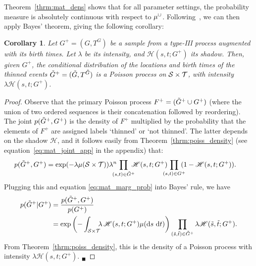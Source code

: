 \documentclass{statsoc}
\newtheorem{coro}[defn]{Corollary}
\begin{document}
Theorem~\ref{thrm:mat_dens} shows that for all parameter settings, the \matern probability measure is absolutely continuous with respect to $\mu^{\cup}$.
Following~\citet[Theorem 3.14]{schervish95}, we can then apply Bayes' theorem, %
giving the following corollary: %
\begin{coro} \label{prop:mat_post} Let ${G^+ = (G, T^G)}$ be a sample from a \matern type-III process 
 augmented with its birth times. Let $\lambda$ be its intensity, and $\mathscr{H}(s,t;G^+)$ its shadow.
Then, given $G^+$, the conditional distribution of the locations and birth times of the thinned events
${\tilde{G}^+ = (\tilde{G},T^{\tilde{G}})}$ is a Poisson process on ${{\mathcal S} \times {\mathcal T}}$, with intensity $\lambda  \mathscr{H}(s,t; G^+)$.
\end{coro}
\begin{proof}
Observe that the primary Poisson process $F^+ = (\tilde{G}^+ \cup G^+)$ (where the union of two ordered sequences is their concatenation followed
by reordering).  The joint $p(\tilde{G}^+, G^+)$ is the density of $F^+$ multiplied by the
probability that the elements of $F^+$ are assigned labels `thinned' or `not thinned'. 
The latter depends on the shadow $\mathscr{H}$, and it follows easily from Theorem~\ref{thrm:poiss_density} 
(see equation~\eqref{eq:mat_joint_app} in the appendix) that:
\begin{align}
   p(\tG^+, G^+) &= \exp(-\lambda \mu(\cS \times \cT)) \lambda^{n}  \! \! \! \!\! \prod_{(s,t) \in \tG^+}  \! \! \! \!\mathscr{H}(s,t;G^+)  \! \! \! \! \! \prod_{(s,t) \in G^+}  \! \! \! \!(1- \mathscr{H}(s,t;G^+)). \label{eq:mat_joint}
\end{align}
Plugging this and equation \eqref{eq:mat_marg_prob} into Bayes' rule, we have
\begin{align}
  p(\tG^+ | G^+) &= \frac{p(\tG^+, G^+)}{p(G^+)} \\ %
  &= \exp \left(- \int_{\cS \times \cT} \!\!\!\lambda\, \mathscr{H}(s,t; G^+) \mu(\dif s\ \dif t) \right)
              \prod_{(\tilde{s},\tilde{t}) \in \tG^+} \lambda \mathscr{H}(\tilde{s}, \tilde{t}; G^+).  \label{eq:mat_post}
\end{align}
From Theorem~\ref{thrm:poiss_density}, this is the density of a Poisson process with intensity $\lambda \mathscr{H}(s, t; G^+)$. \hfill ${}_\blacksquare$ %
\end{proof}
\end{document}
